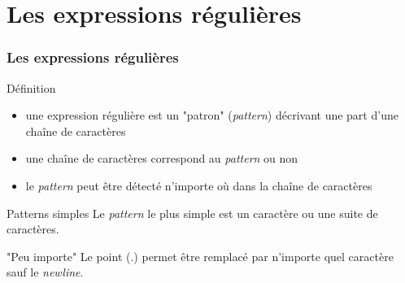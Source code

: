 \section{Les expressions régulières}

\begin{frame}[fragile]
  \frametitle{Les expressions régulières}

  \begin{block}{Définition}
    \begin{itemize}
    \item une expression régulière est un "patron" (\textit{pattern})
      décrivant une part d'une chaîne de caractères
    \item une chaîne de caractères correspond au \textit{pattern} ou non
    \item le \textit{pattern} peut être détecté n'importe où dans la
      chaîne de caractères
    \end{itemize}
  \end{block}

  \begin{exampleblock}{Patterns simples}
    Le \textit{pattern} le plus simple est un caractère ou une suite
    de caractères.
  \end{exampleblock}

  \begin{alertblock}{"Peu importe"}
    Le point (.) permet être remplacé par n'importe quel caractère sauf
    le \textit{newline}.
  \end{alertblock}

\end{frame}

